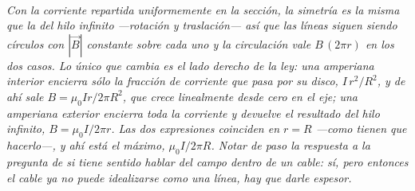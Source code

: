 \begin{center}
\\[0.5em]
{\small\itshape Con la corriente repartida uniformemente en la sección, la
simetría es la misma que la del hilo infinito ---rotación y traslación--- así
que las líneas siguen siendo círculos con $|\vec B|$ constante sobre cada uno y
la circulación vale $B\,(2\pi r)$ en los dos casos. Lo único que cambia es el
lado derecho de la ley: una amperiana interior encierra sólo la fracción de
corriente que pasa por su disco, $I\,r^2/R^2$, y de ahí sale
$B = \mu_0 I r/2\pi R^2$, que \emph{crece} linealmente desde cero en el eje;
una amperiana exterior encierra toda la corriente y devuelve el resultado del
hilo infinito, $B = \mu_0 I/2\pi r$. Las dos expresiones coinciden en $r=R$
---como tienen que hacerlo---, y ahí está el máximo, $\mu_0 I/2\pi R$. Notar de
paso la respuesta a la pregunta de si tiene sentido hablar del campo
\emph{dentro} de un cable: sí, pero entonces el cable ya no puede idealizarse
como una línea, hay que darle espesor.}
\end{center}
